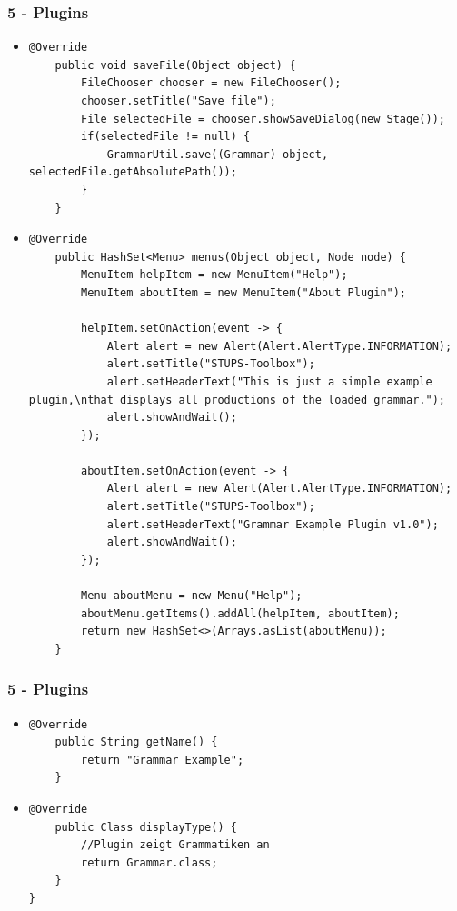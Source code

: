 \documentclass[9pt, xcolor={dvipsnames}]{beamer}
\begin{document}
\begin{frame}[fragile]\frametitle{5 - Plugins}
	\begin{itemize}
		\item[]
		\begin{lstlisting}[frame=single, basicstyle=\tiny]
	@Override
	public void saveFile(Object object) {
		FileChooser chooser = new FileChooser();
		chooser.setTitle("Save file");
		File selectedFile = chooser.showSaveDialog(new Stage());
		if(selectedFile != null) {
			GrammarUtil.save((Grammar) object, selectedFile.getAbsolutePath());
		}
	}
		\end{lstlisting}
		\pause
		\item[]
		\begin{lstlisting}[frame=single, basicstyle=\tiny]
	@Override
	public HashSet<Menu> menus(Object object, Node node) {
		MenuItem helpItem = new MenuItem("Help");
		MenuItem aboutItem = new MenuItem("About Plugin");
		
		helpItem.setOnAction(event -> {
			Alert alert = new Alert(Alert.AlertType.INFORMATION);
			alert.setTitle("STUPS-Toolbox");
			alert.setHeaderText("This is just a simple example plugin,\nthat displays all productions of the loaded grammar.");
			alert.showAndWait();
		});
		
		aboutItem.setOnAction(event -> {
			Alert alert = new Alert(Alert.AlertType.INFORMATION);
			alert.setTitle("STUPS-Toolbox");
			alert.setHeaderText("Grammar Example Plugin v1.0");
			alert.showAndWait();
		});
		
		Menu aboutMenu = new Menu("Help");
		aboutMenu.getItems().addAll(helpItem, aboutItem);
		return new HashSet<>(Arrays.asList(aboutMenu));
	}
		\end{lstlisting}
	\end{itemize}
\end{frame}

\begin{frame}[fragile]\frametitle{5 - Plugins}
	\begin{itemize}
		\item[]
		\begin{lstlisting}[frame=single, basicstyle=\tiny]
	@Override
	public String getName() {
		return "Grammar Example";
	}
		\end{lstlisting}
		\pause
		\item[]
		\begin{lstlisting}[frame=single, basicstyle=\tiny]
	@Override
	public Class displayType() {
		//Plugin zeigt Grammatiken an
		return Grammar.class;
	}
}
		\end{lstlisting}
	\end{itemize}
\end{frame}
\end{document}
